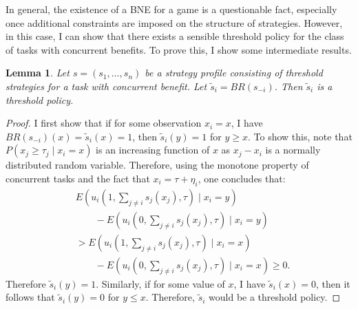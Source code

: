 \documentclass[defaultstyle,12pt]{proposal}
\newtheorem{lemma}{Lemma}
\begin{document}
In general, the existence of a BNE for a game is a questionable fact, especially once additional constraints are imposed on the structure of strategies. However, in this case, I can show that there exists a sensible threshold policy for the class of tasks with concurrent benefits. To prove this, I show some intermediate results. 
\begin{lemma}\label{lemma:thresholdBR}
Let $s=(s_1,\ldots,s_n)$ be a strategy profile consisting of threshold strategies for a task with concurrent benefit. Let $\tilde{s}_i=BR(s_{-i})$. Then $\tilde{s}_i$ is a threshold policy. 
\end{lemma}
\begin{proof}
I first show that if for some observation $x_i=x$, I have $BR(s_{-i})(x)=\tilde{s}_i(x)=1$, then $\tilde{s}_i(y)=1$ for $y\geq x$. To show this,  note that $P(x_j\geq \tau_j\mid x_i=x)$ is an increasing function of $x$ as $x_j-x_i$ is a normally distributed random variable. Therefore, using the monotone property of concurrent tasks and the fact that $x_i=\tau+\eta_i$, one concludes that:
\vspace{-5px}
\begin{align*}
&E(u_i(1,\sum_{j\not=i}s_j(x_j),\tau)\mid x_i=y)\\ 
&\qquad-E(u_i(0,\sum_{j\not=i}s_j(x_j),\tau)\mid x_i=y)\\ 
&>E(u_i(1,\sum_{j\not=i}s_j(x_j),\tau)\mid x_i=x)\\
&\qquad-E(u_i(0,\sum_{j\not=i}s_j(x_j),\tau)\mid x_i=x)\geq 0.
\end{align*}
Therefore $\tilde{s}_i(y)=1$. Similarly, if for some value of $x$, I have $\tilde{s}_i(x)=0$, then it follows that $\tilde{s}_i(y)=0$ for $y\leq x$. Therefore, $\tilde{s}_i$ would be a threshold policy.  
\end{proof}
\end{document}
